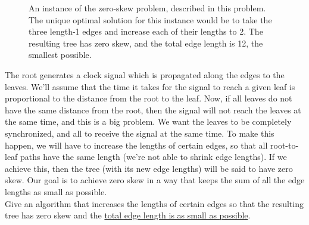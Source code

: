 \documentclass[letter,11pt]{article}
\begin{document}
\begin{figure}[h]
  \centering
  \caption{An instance of the zero-skew problem, described in this problem.  The
    unique optimal solution for this instance would be to take the three
    length-1 edges and increase each of their lengths to 2. The resulting tree
    has zero skew, and the total edge length is 12, the smallest possible.}
\end{figure}

The root generates a clock signal which is propagated along the edges
to the leaves. We’ll assume that the time it takes for the signal to reach a
given leaf is proportional to the distance from the root to the leaf.
Now, if all leaves do not have the same distance from the root, then
the signal will not reach the leaves at the same time, and this is a big
problem. We want the leaves to be completely synchronized, and all to
receive the signal at the same time. To make this happen, we will have to
increase the lengths of certain edges, so that all root-to-leaf paths have
the same length (we’re not able to shrink edge lengths). If we achieve this,
then the tree (with its new edge lengths) will be said to have zero skew.
Our goal is to achieve zero skew in a way that keeps the sum of all the
edge lengths as small as possible.\\


Give an algorithm that increases the lengths of certain edges so that
the resulting tree has zero skew and the \underline{total edge length is as small as
possible}.
\end{document}
